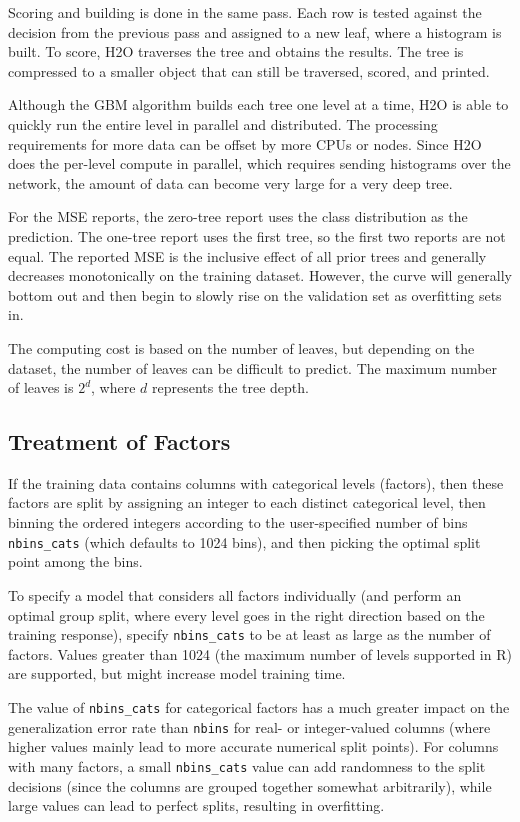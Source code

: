 Scoring and building is done in the same pass. Each row is tested against the decision from the previous pass and assigned
to a new leaf, where a histogram is built. To score, H2O traverses the tree and obtains the results. The
tree is compressed to a smaller object that can still be traversed, scored, and printed.

Although the GBM algorithm builds each tree one level at a time, H2O is able to quickly run the entire level in
parallel and distributed. The processing requirements for more data can be offset by more CPUs or nodes.
Since H2O does the per-level compute in parallel, which requires sending histograms over the network, the amount
of data can become very large for a very deep tree.


For the MSE reports, the zero-tree report uses the class distribution as the prediction. The one-tree report
uses the first tree, so the first two reports are not equal. The reported MSE is the inclusive effect of all
prior trees and generally decreases monotonically on the training dataset. However, the curve will generally
bottom out and then begin to slowly rise on the validation set as overfitting sets in.

The computing cost is based on the number of leaves, but depending on the dataset, the number of leaves can be
difficult to predict. The maximum number of leaves is $2^d$, where $d$ represents the tree depth.

\subsection{Treatment of Factors}

If the training data contains columns with categorical levels (factors), then these factors are split by assigning an integer to each distinct
categorical level, then binning the ordered integers according to the user-specified number of bins \texttt{nbins\_cats} (which defaults to 1024 bins),
and then picking the optimal split point among the bins.

To specify a model that considers all factors individually (and perform an optimal group split,
where every level goes in the right direction based on the training response), specify \texttt{nbins\_cats} to be at least as large as the number of factors.
Values greater than 1024 (the maximum number of levels supported in R) are supported, but might increase model training time.

The value of \texttt{nbins\_cats} for categorical factors has a much greater impact on the generalization error rate than \texttt{nbins} for real- or integer-valued columns (where higher values mainly lead to more accurate numerical split points).
For columns with many factors, a small \texttt{nbins\_cats} value can add randomness to the split decisions (since the columns are grouped together somewhat arbitrarily), while large values can lead to perfect splits, resulting in overfitting.

